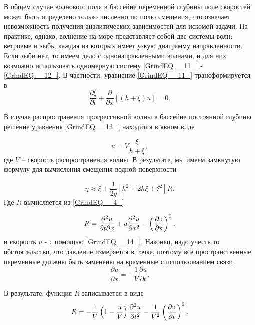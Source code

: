 В общем случае волнового поля в бассейне переменной глубины поле скоростей может быть определено только численно по полю смещения, что означает невозможность получения аналитических зависимостей для искомой задачи. На практике, однако, волнение на море представляет собой две системы волн: ветровые и зыбь, каждая из которых имеет узкую диаграмму направленности. Если зыби нет, то имеем дело с однонаправленными волнами, и для них возможно использовать одномерную систему \eqref{GrindEQ__11_} - \eqref{GrindEQ__12_}. В частности, уравнение \eqref{GrindEQ__11_} трансформируется в
\begin{equation} \label{GrindEQ__13_}
\frac{\partial \xi }{\partial t} +\frac{\partial }{\partial x} \left[\left(h+\xi \right)u\right]=0.
\end{equation}


В случае распространения прогрессивной волны в бассейне постоянной глубины решение уравнения \eqref{GrindEQ__13_} находится в явном виде

\begin{equation} \label{GrindEQ__14_}
u=V\frac{\xi }{h+\xi } ,
\end{equation}
где $V$ -- скорость распространения волны. В результате, мы имеем замкнутую формулу для вычисления смещения водной поверхности

\begin{equation} \label{GrindEQ__15_}
\eta \approx \xi +\frac{1}{2g} \left[h^{2} +2h\xi +\xi ^{2} \right]R.
\end{equation}
Где $R$ вычисляется из \eqref{GrindEQ__4_}

\begin{equation} \label{GrindEQ__16_}
R=\frac{\partial ^{2} u}{\partial t\partial x} +u\frac{\partial ^{2} u}{\partial x^{2} } -\left(\frac{\partial {\rm u}}{\partial {\rm x}} \right)^{2} ,
\end{equation}
и скорость $u$ - с помощью \eqref{GrindEQ__14_}. Наконец, надо учесть то обстоятельство, что давление измеряется в точке, поэтому все пространственные переменные должны быть заменены на временные с использованием связи
\begin{equation} \label{GrindEQ__17_}
\frac{\partial u}{\partial x} =-\frac{1}{V} \frac{\partial u}{\partial t} .
\end{equation}


В результате, функция $R$ записывается в виде
\begin{equation} \label{GrindEQ__18_}
R=-\frac{1}{V} \left(1-\frac{u}{V} \right)\frac{\partial ^{2} u}{\partial t^{2} } -\frac{1}{V^{2} } \left(\frac{\partial {\rm u}}{\partial t} \right)^{2}.
\end{equation}


